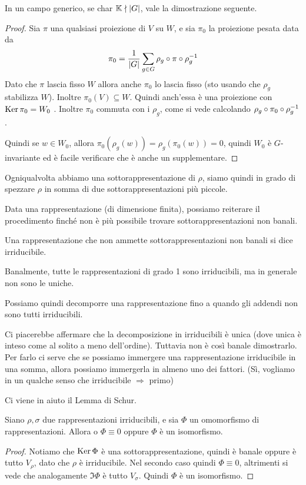	In un campo generico, se char $\mathbb K \nmid \left|G\right|$, vale la dimostrazione seguente.
	\begin{proof}
		Sia $\pi$ una qualsiasi proiezione di $V$ su $W$, e sia $\pi_0$ la proiezione pesata data da
		\[
		\pi_0=\frac1{\left|G\right|} \sum_{g\in G} \rho_g \circ \pi \circ \rho_g^{-1}
		\]
		Dato che $\pi$ lascia fisso $W$ allora anche $\pi_0$ lo lascia fisso (sto usando che $\rho_g$ stabilizza $W$). Inoltre $\pi_0(V) \subseteq W$. Quindi anch'essa è una proiezione con $\operatorname{Ker} \pi_0=W_0$ . Inoltre $\pi_0$ commuta con i $\rho_g$, come si vede calcolando $\rho_g \circ \pi_0 \circ \rho_g^{-1}$.
		
		Quindi se $w\in W_0$, allora $\pi_0 (\rho_g(w))=\rho_g(\pi_0(w))=0$, quindi $W_0$ è $G$-invariante ed è facile verificare che è anche un supplementare.
	\end{proof}

	Ogniqualvolta abbiamo una sottorappresentazione di $\rho$, siamo quindi in grado di spezzare $\rho$ in somma di due sottorappresentazioni più piccole. 

	Data una rappresentazione (di dimensione finita), possiamo reiterare il procedimento finché non è più possibile trovare sottorappresentazioni non banali.

	\begin{mydef}
		Una rappresentazione che non ammette sottorappresentazioni non banali si dice irriducibile.
	\end{mydef}

	Banalmente, tutte le rappresentazioni di grado 1 sono irriducibili, ma in generale non sono le uniche.

	Possiamo quindi decomporre una rappresentazione fino a quando gli addendi non sono tutti irriducibili.

	Ci piacerebbe affermare che la decomposizione in irriducibili è unica (dove unica è inteso come al solito a meno dell'ordine). Tuttavia non è così banale dimostrarlo. Per farlo ci serve che se possiamo immergere una rappresentazione irriducibile in una somma, allora possiamo immergerla in almeno uno dei fattori. (Sì, vogliamo in un qualche senso che irriducibile $\Rightarrow$ primo)

	Ci viene in aiuto il Lemma di Schur.

	\begin{mytheorem}
		Siano $\rho,\sigma$ due rappresentazioni irriducibili, e sia $\Phi$ un omomorfismo di rappresentazioni. Allora o $\Phi \equiv 0$ oppure $\Phi$ è un isomorfismo.
	\end{mytheorem}
	\begin{proof}
		Notiamo che $\operatorname{Ker} \Phi$ è una sottorappresentazione, quindi è banale oppure è tutto $V_\rho$, dato che $\rho$ è irriducibile. Nel secondo caso quindi $\Phi\equiv 0$, altrimenti si vede che analogamente $\Im \Phi$ è tutto $V_\sigma$. Quindi $\Phi$ è un isomorfismo.
	\end{proof}

